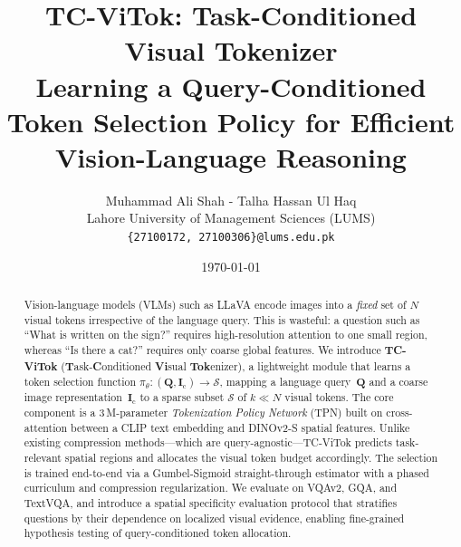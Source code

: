 \documentclass[11pt,a4paper]{article}
\newcommand{\mI}{\mathbf{I}}
\newcommand{\mQ}{\mathbf{Q}}
\begin{document}

\title{%
  \textbf{TC-ViTok: Task-Conditioned Visual Tokenizer} \\[0.3em]
  \large Learning a Query-Conditioned Token Selection Policy
  for Efficient Vision-Language Reasoning%
}

\author{%
  Muhammad Ali Shah -  Talha Hassan Ul Haq \\[0.3em]
  Lahore University of Management Sciences (LUMS) \\
  \texttt{\{27100172, 27100306\}@lums.edu.pk}%
}

\date{\today}
\maketitle

\begin{abstract}

Vision-language models (VLMs) such as LLaVA encode images into a
\emph{fixed} set of $N$ visual tokens irrespective of the language query.
This is wasteful: a question such as ``What is written on the sign?''
requires high-resolution attention to one small region, whereas ``Is there
a cat?'' requires only coarse global features. We introduce \textbf{TC-ViTok}
(\textbf{T}ask-\textbf{C}onditioned \textbf{Vi}sual \textbf{Tok}enizer), a
lightweight module that learns a token selection function
$\pi_\theta\colon(\mQ, \mI_{\mathrm{c}})\to\mathcal{S}$, mapping a language
query~$\mQ$ and a coarse image representation~$\mI_{\mathrm{c}}$ to a sparse
subset $\mathcal{S}$ of $k \ll N$ visual tokens. The core component is a
3\,M-parameter \emph{Tokenization Policy Network} (TPN) built on cross-attention
between a CLIP text embedding and DINOv2-S spatial features. Unlike existing
compression methods---which are query-agnostic---TC-ViTok predicts task-relevant
spatial regions and allocates the visual token budget accordingly. The selection
is trained end-to-end via a Gumbel-Sigmoid straight-through estimator with a
phased curriculum and compression regularization. We evaluate on VQAv2, GQA,
and TextVQA, and introduce a spatial specificity evaluation protocol that
stratifies questions by their dependence on localized visual evidence, enabling
fine-grained hypothesis testing of query-conditioned token allocation.

\end{abstract}
\end{document}
